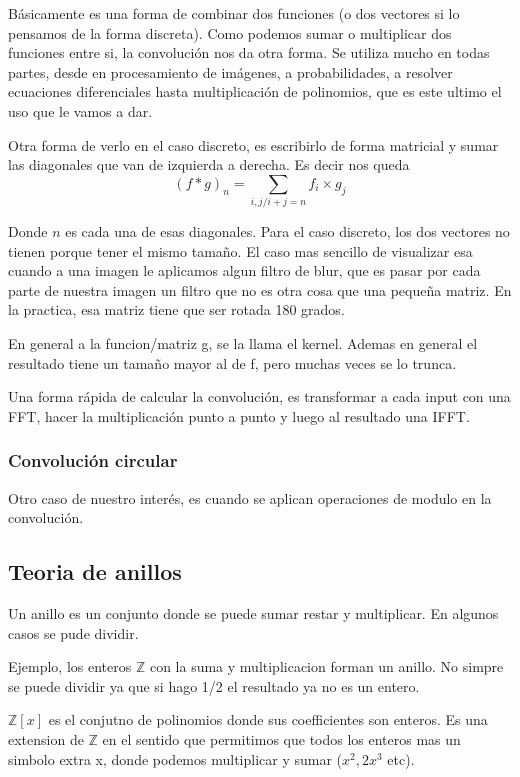 \documentclass[12pt, oneside]{article}
\newcommand{\Z}{\mathbb{Z}}
\begin{document}
Básicamente es una forma de combinar dos funciones (o dos vectores si lo pensamos de la forma discreta).
Como podemos sumar o multiplicar dos funciones entre si, la convolución nos da otra forma.
Se utiliza mucho en todas partes, desde en procesamiento de imágenes, a probabilidades, a resolver ecuaciones diferenciales hasta
multiplicación   de polinomios, que es este ultimo el uso que le vamos a dar.

Otra forma de verlo en el caso discreto, es escribirlo de forma matricial y sumar las diagonales que van de izquierda a derecha.
Es decir nos queda
\begin{equation*}
    (f*g)_n = \sum_{i,j / i+j=n} f_i\times g_j
\end{equation*}

Donde $n$ es cada una de esas diagonales.
Para el caso discreto, los dos vectores no tienen porque tener el mismo tamaño.
El caso mas sencillo de visualizar esa cuando a una imagen le aplicamos algun filtro de blur, que es pasar por cada parte
de nuestra imagen un filtro que no es otra cosa que una pequeña matriz.
En la practica, esa matriz tiene que ser rotada 180 grados.

En general a la funcion/matriz g, se la llama el kernel.
Ademas en general el resultado tiene un tamaño mayor al de f, pero muchas veces se lo trunca.

Una forma rápida de calcular la convolución, es transformar a cada input con una FFT, hacer
la multiplicación punto a punto y luego al resultado una IFFT.

\subsubsection{Convolución circular}
Otro caso de nuestro interés, es cuando se aplican operaciones de modulo en la convolución.



\subsection{Teoria de anillos}
Un anillo es un conjunto donde se puede sumar restar y multiplicar.
En algunos casos se pude dividir.

Ejemplo, los enteros $\Z$ con la suma y multiplicacion forman un anillo.
No simpre se puede dividir ya que si hago 1/2 el resultado ya no es un entero.

$\Z[x]$ es el conjutno de polinomios donde sus coefficientes son enteros.
Es una extension de $\Z$ en el sentido que permitimos que todos los enteros
mas un simbolo extra x, donde podemos multiplicar y sumar ($x^2, 2x^3$ etc).
\end{document}
